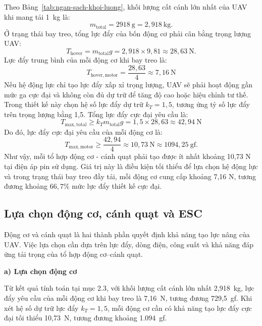 Theo Bảng~\ref{tab:ngan-sach-khoi-luong}, khối lượng cất cánh lớn nhất của UAV khi mang tải 1~kg là:
\begin{equation}
  m_{\mathrm{total}}=2918~\mathrm{g}=2{,}918~\mathrm{kg}.
\end{equation}
\indent Ở trạng thái bay treo, tổng lực đẩy của bốn động cơ phải cân bằng trọng lượng UAV:
\begin{equation}
  T_{\mathrm{hover}}=m_{\mathrm{total}}g
  =2{,}918\times9{,}81
  \approx28{,}63~\mathrm{N}.
\end{equation}
\indent Lực đẩy trung bình của mỗi động cơ khi bay treo là:
\begin{equation}
  T_{\mathrm{hover,motor}}
  =\frac{28{,}63}{4}
  \approx7{,}16~\mathrm{N}
\end{equation}
\indent Nếu hệ động lực chỉ tạo lực đẩy xấp xỉ trọng lượng, UAV sẽ phải hoạt động gần mức ga cực đại và không còn đủ dự trữ để tăng độ cao hoặc hiệu chỉnh tư thế. Trong thiết kế này chọn hệ số lực đẩy dự trữ $k_T=1{,}5$, tương ứng tỷ số lực đẩy trên trọng lượng bằng 1,5. Tổng lực đẩy cực đại yêu cầu là:
\begin{equation}
  T_{\mathrm{max,total}}
  \geq k_Tm_{\mathrm{total}}g
  =1{,}5\times28{,}63
  \approx42{,}94~\mathrm{N}
\end{equation}
\indent Do đó, lực đẩy cực đại yêu cầu của mỗi động cơ là:
\begin{equation}
  T_{\mathrm{max,motor}}
  \geq\frac{42{,}94}{4}
  \approx10{,}73~\mathrm{N}
    \approx1094{,}25~\mathrm{gf}.
  \label{eq:luc-day-moi-dong-co}
\end{equation}
\indent Như vậy, mỗi tổ hợp động cơ - 
cánh quạt phải tạo được ít nhất khoảng 
10,73 N tại điện áp pin sử dụng. 
Giá trị này là điều kiện tối thiểu để 
lựa chọn hệ động lực và trong trạng 
thái bay treo đầy tải, mỗi động cơ 
cung cấp khoảng 7,16 N, tương đương khoảng $66{,}7\%$ mức lực đẩy thiết kế cực đại.

\subsection{Lựa chọn động cơ, cánh quạt và ESC}

Động cơ và cánh quạt là hai thành phần quyết định khả năng tạo lực nâng của UAV. Việc lựa chọn cần dựa trên lực đẩy, dòng điện, công suất và khả năng đáp ứng tải trọng của tổ hợp động cơ--cánh quạt.

\noindent\textbf{a) Lựa chọn động cơ}

Từ kết quả tính toán tại mục 2.3, với khối lượng cất cánh lớn nhất 2,918~kg, lực đẩy yêu cầu của mỗi động cơ khi bay treo là 7,16~N, tương đương 729,5~gf. Khi xét hệ số dự trữ lực đẩy $k_T=1{,}5$, mỗi động cơ cần có khả năng tạo lực đẩy cực đại tối thiểu 10,73~N, tương đương khoảng 1.094~gf.

